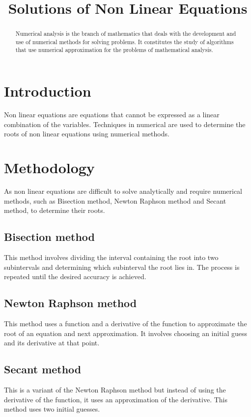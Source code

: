 \documentclass[10pt,a4paper,oneside]{article}
\begin{document}
    \title{Solutions of Non Linear Equations}
    \maketitle
    \begin{abstract}
       Numerical analysis is the branch of mathematics that deals with the development and use of numerical methods for solving problems. It constitutes the study of algorithms that use numerical approximation for the problems of mathematical analysis.
    \end{abstract}
\section{Introduction}
   Non linear equations are equations that cannot be expressed as a linear combination of the variables. Techniques in numerical are used to determine the roots of non linear equations using numerical methods. 
\section{Methodology} 
As non linear equations are difficult to solve analytically and require numerical methods, such as Bisection method, Newton Raphson method and Secant method, to determine their roots. 

\subsection{Bisection method}
This method involves dividing the interval containing the root into two subintervals and determining which subinterval the root lies in. The process is repeated until the desired accuracy is achieved.

\subsection{Newton Raphson method} 
This method uses a function and a derivative of the function to approximate the root of an equation and next approximation. 
It involves choosing an initial guess and its derivative at that point.

\subsection{Secant method}
This is a variant of the Newton Raphson method but instead of using the derivative of the function, it uses an approximation of the derivative. 
This method uses two initial guesses.
\end{document}

